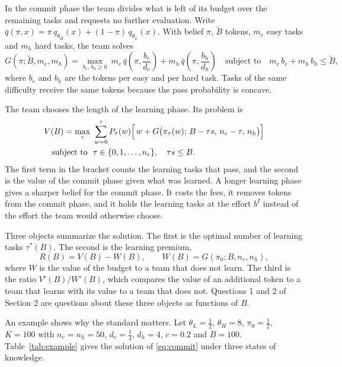 \documentclass[11pt]{article}
\begin{document}
In the commit phase the team divides what is left of its budget over the remaining tasks and requests no further evaluation. Write $\bar q(\pi,x)=\pi\,q_{\theta_H}(x)+(1-\pi)\,q_{\theta_L}(x)$. With belief $\pi$, $\tilde B$ tokens, $m_e$ easy tasks and $m_h$ hard tasks, the team solves
\begin{equation}\label{eq:commit}
G(\pi;\tilde B,m_e,m_h)=\max_{b_e,\,b_h\ge0}\ m_e\,\bar q\!\left(\pi,\frac{b_e}{d_e}\right)+m_h\,\bar q\!\left(\pi,\frac{b_h}{d_h}\right)
\quad\text{subject to}\quad m_e\,b_e+m_h\,b_h\le\tilde B ,
\end{equation}
where $b_e$ and $b_h$ are the tokens per easy and per hard task. Tasks of the same difficulty receive the same tokens because the pass probability is concave.

The team chooses the length of the learning phase. Its problem is
\begin{equation}\label{eq:team}
\begin{aligned}
V(B)=\max_{\tau}\ &\sum_{w=0}^{\tau}P_\tau(w)\Bigl[\,w+G\bigl(\pi_\tau(w);\,B-\tau s,\,n_e-\tau,\,n_h\bigr)\Bigr]\\
\text{subject to}\ \ &\tau\in\{0,1,\dots,n_e\},\quad \tau s\le B .
\end{aligned}
\end{equation}
The first term in the bracket counts the learning tasks that pass, and the second is the value of the commit phase given what was learned. A longer learning phase gives a sharper belief for the commit phase. It costs the fees, it removes tokens from the commit phase, and it holds the learning tasks at the effort $b^I$ instead of the effort the team would otherwise choose.

Three objects summarize the solution. The first is the optimal number of learning tasks $\tau^*(B)$. The second is the learning premium,
\[
R(B)=V(B)-W(B),\qquad W(B)=G(\pi_0;B,n_e,n_h),
\]
where $W$ is the value of the budget to a team that does not learn. The third is the ratio $V'(B)/W'(B)$, which compares the value of an additional token to a team that learns with its value to a team that does not. Questions 1 and 2 of Section 2 are questions about these three objects as functions of $B$.

An example shows why the standard matters. Let $\theta_L=\tfrac12$, $\theta_H=8$, $\pi_0=\tfrac12$, $K=100$ with $n_e=n_h=50$, $d_e=\tfrac14$, $d_h=4$, $c=0.2$ and $B=100$. Table~\ref{tab:example} gives the solution of \eqref{eq:commit} under three states of knowledge.
\end{document}
